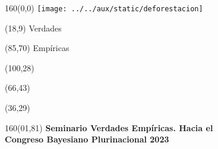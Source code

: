 \documentclass[shownotes,aspectratio=169]{beamer}
\begin{document}
\begin{frame}


\begin{textblock}{160}(0,0)
\texttt{[image: ../../aux/static/deforestacion]}
\end{textblock}

\begin{textblock}{80}(18,9)
\textcolor{black!15}{\fontsize{44}{55}\selectfont Verdades}
\end{textblock}

\begin{textblock}{47}(85,70)
\centering \textcolor{black!15}{{\fontsize{52}{65}\selectfont Empíricas}}
\end{textblock}

\begin{textblock}{80}(100,28)
\LARGE  \textcolor{black!15}{}
\end{textblock}

\begin{textblock}{80}(66,43)
\LARGE  \textcolor{black!15}{\scalebox{6}{$=$}}
\end{textblock}

\begin{textblock}{80}(36,29)
\LARGE  \textcolor{black!15}{\scalebox{9}{$p$}}
\end{textblock}

\vspace{2cm}
\maketitle



\begin{textblock}{160}(01,81)
\footnotesize \textcolor{black!5}{\textbf{Seminario Verdades Empíricas. Hacia el \\
Congreso Bayesiano Plurinacional 2023} \\}
\end{textblock}

\end{frame}
\end{document}
